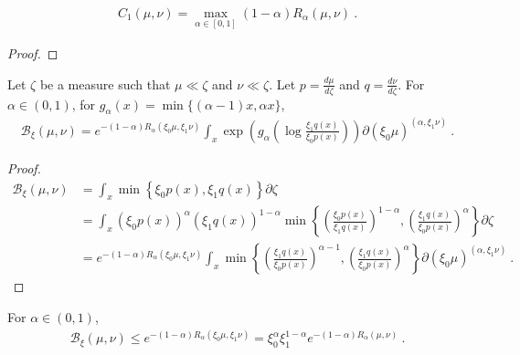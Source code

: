 \begin{lemma}
  \label{lem:chernoff_eq_max_renyi}
  \begin{align*}
  C_1(\mu, \nu) = \max_{\alpha\in [0,1]} (1 - \alpha)R_\alpha(\mu, \nu) \: .
  \end{align*}
\end{lemma}

\begin{proof}%
\uses{}
\end{proof}


\begin{lemma}
  \label{lem:bayesBinaryRisk_eq_exp_renyi_mul_integral}
  Let $\zeta$ be a measure such that $\mu \ll \zeta$ and $\nu \ll \zeta$. Let $p = \frac{d \mu}{d\zeta}$ and $q = \frac{d \nu}{d\zeta}$.
  For $\alpha \in (0,1)$, for $g_\alpha(x) = \min\{(\alpha-1)x, \alpha x\}$,
  \begin{align*}
  \mathcal B_\xi(\mu, \nu)
  = e^{-(1 - \alpha) R_\alpha(\xi_0\mu, \xi_1\nu)} \int_x \exp \left(g_\alpha\left( \log \frac{\xi_1 q(x)}{\xi_0 p(x)} \right)\right) \partial(\xi_0\mu)^{(\alpha, \xi_1\nu)}
  \: .
  \end{align*}
\end{lemma}

\begin{proof}%
{}
\begin{align*}
\mathcal B_\xi(\mu, \nu)
&= \int_x \min \left\{\xi_0 p(x), \xi_1 q(x)\right\} \partial\zeta
\\
&= \int_x (\xi_0 p(x))^\alpha (\xi_1 q(x))^{1-\alpha} \min \left\{ \left(\frac{\xi_0p(x)}{\xi_1q(x)}\right)^{1 - \alpha}, \left(\frac{\xi_1q(x)}{\xi_0p(x)}\right)^\alpha\right\} \partial\zeta
\\
&= e^{-(1 - \alpha) R_\alpha(\xi_0\mu, \xi_1\nu)} \int_x \min \left\{ \left(\frac{\xi_1q(x)}{\xi_0p(x)}\right)^{\alpha - 1}, \left(\frac{\xi_1q(x)}{\xi_0p(x)}\right)^\alpha\right\} \partial(\xi_0\mu)^{(\alpha, \xi_1\nu)}
\: .
\end{align*}
\end{proof}


\begin{corollary}
  \label{cor:bayesBinaryRisk_le_exp_renyi}
  For $\alpha \in (0,1)$,
  \begin{align*}
  \mathcal B_\xi(\mu, \nu)
  \le e^{-(1 - \alpha) R_\alpha(\xi_0\mu, \xi_1\nu)}
  = \xi_0^\alpha \xi_1^{1-\alpha} e^{-(1 - \alpha) R_\alpha(\mu, \nu)}
  \: .
  \end{align*}
\end{corollary}

